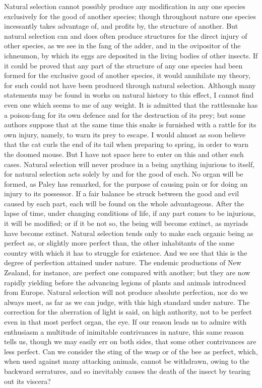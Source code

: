 Natural selection cannot possibly produce any modification in any one species exclusively for the good of another species; though throughout nature one species incessantly takes advantage of, and profits by, the structure of another. But natural selection can and does often produce structures for the direct injury of other species, as we see in the fang of the adder, and in the ovipositor of the ichneumon, by which its eggs are deposited in the living bodies of other insects. If it could be proved that any part of the structure of any one species had been formed for the exclusive good of another species, it would annihilate my theory, for such could not have been produced through natural selection. Although many statements may be found in works on natural history to this effect, I cannot find even one which seems to me of any weight. It is admitted that the rattlesnake has a poison-fang for its own defence and for the destruction of its prey; but some authors suppose that at the same time this snake is furnished with a rattle for its own injury, namely, to warn its prey to escape. I would almost as soon believe that the cat curls the end of its tail when preparing to spring, in order to warn the doomed mouse. But I have not space here to enter on this and other such cases.
Natural selection will never produce in a being anything injurious to itself, for natural selection acts solely by and for the good of each. No organ will be formed, as Paley has remarked, for the purpose of causing pain or for doing an injury to its possessor. If a fair balance be struck between the good and evil caused by each part, each will be found on the whole advantageous. After the lapse of time, under changing conditions of life, if any part comes to be injurious, it will be modified; or if it be not so, the being will become extinct, as myriads have become extinct.
Natural selection tends only to make each organic being as perfect as, or slightly more perfect than, the other inhabitants of the same country with which it has to struggle for existence. And we see that this is the degree of perfection attained under nature. The endemic productions of New Zealand, for instance, are perfect one compared with another; but they are now rapidly yielding before the advancing legions of plants and animals introduced from Europe. Natural selection will not produce absolute perfection, nor do we always meet, as far as we can judge, with this high standard under nature. The correction for the aberration of light is said, on high authority, not to be perfect even in that most perfect organ, the eye. If our reason leads us to admire with enthusiasm a multitude of inimitable contrivances in nature, this same reason tells us, though we may easily err on both sides, that some other contrivances are less perfect. Can we consider the sting of the wasp or of the bee as perfect, which, when used against many attacking animals, cannot be withdrawn, owing to the backward serratures, and so inevitably causes the death of the insect by tearing out its viscera?
